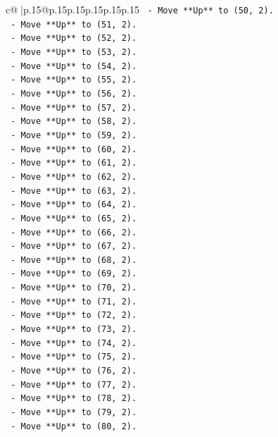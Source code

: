\documentclass{article}
\begin{document}
{\begin{supertabular}{c@{$\;$}|p{.15\linewidth}@{}p{.15\linewidth}p{.15\linewidth}p{.15\linewidth}p{.15\linewidth}p{.15\linewidth}}
{{{\texttt{    {-} Move **Up** to (50, 2).} \\
\texttt{    {-} Move **Up** to (51, 2).} \\
\texttt{    {-} Move **Up** to (52, 2).} \\
\texttt{    {-} Move **Up** to (53, 2).} \\
\texttt{    {-} Move **Up** to (54, 2).} \\
\texttt{    {-} Move **Up** to (55, 2).} \\
\texttt{    {-} Move **Up** to (56, 2).} \\
\texttt{    {-} Move **Up** to (57, 2).} \\
\texttt{    {-} Move **Up** to (58, 2).} \\
\texttt{    {-} Move **Up** to (59, 2).} \\
\texttt{    {-} Move **Up** to (60, 2).} \\
\texttt{    {-} Move **Up** to (61, 2).} \\
\texttt{    {-} Move **Up** to (62, 2).} \\
\texttt{    {-} Move **Up** to (63, 2).} \\
\texttt{    {-} Move **Up** to (64, 2).} \\
\texttt{    {-} Move **Up** to (65, 2).} \\
\texttt{    {-} Move **Up** to (66, 2).} \\
\texttt{    {-} Move **Up** to (67, 2).} \\
\texttt{    {-} Move **Up** to (68, 2).} \\
\texttt{    {-} Move **Up** to (69, 2).} \\
\texttt{    {-} Move **Up** to (70, 2).} \\
\texttt{    {-} Move **Up** to (71, 2).} \\
\texttt{    {-} Move **Up** to (72, 2).} \\
\texttt{    {-} Move **Up** to (73, 2).} \\
\texttt{    {-} Move **Up** to (74, 2).} \\
\texttt{    {-} Move **Up** to (75, 2).} \\
\texttt{    {-} Move **Up** to (76, 2).} \\
\texttt{    {-} Move **Up** to (77, 2).} \\
\texttt{    {-} Move **Up** to (78, 2).} \\
\texttt{    {-} Move **Up** to (79, 2).} \\
\texttt{    {-} Move **Up** to (80, 2).} \\
}}}
\end{supertabular}}
\end{document}
